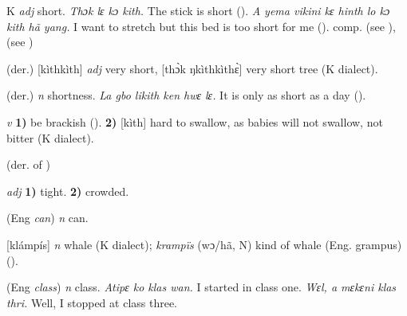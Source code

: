 \begin{letter}{K}
 \textit{adj} short. \textit{Thɔk lɛ kɔ kith.} The stick is short (\citealt{Pichl1967}). \textit{A yema vikini kɛ hinth lo kɔ kith hã yang.} I want to stretch but this bed is too short for me (\citealt{Pichl1967}). comp.  (see ),  (see )

 (der.) [kìthkìth] \textit{adj} very short, [thɔ̀k ŋkìthkìthɛ̀] very short tree (K dialect). 

 (der.) \textit{n} shortness. \textit{La gbo likith ken hwɛ lɛ.} It is only as short as a day (\citealt{Pichl1967}). 

 \textit{v} \textbf{1)} be brackish (\citealt{Pichl1967}). \textbf{2)} [kìth] hard to swallow, as babies will not swallow, not bitter (K dialect).

 (der. of ) 

 \textit{adj} \textbf{1)} tight. \textbf{2)} crowded.

 (Eng \textit{can}) \textit{n} can.

 [klámpís] \textit{n} whale (K dialect); \textit{krampïs} (wɔ/hã, N) kind of whale (Eng. grampus) (\citealt{Pichl1967}). 

 (Eng \textit{class}) \textit{n} class. \textit{Atipɛ ko klas wan.} I started in class one. \textit{Wɛl, a mɛkɛni klas thri.} Well, I stopped at class three.


\end{letter}

